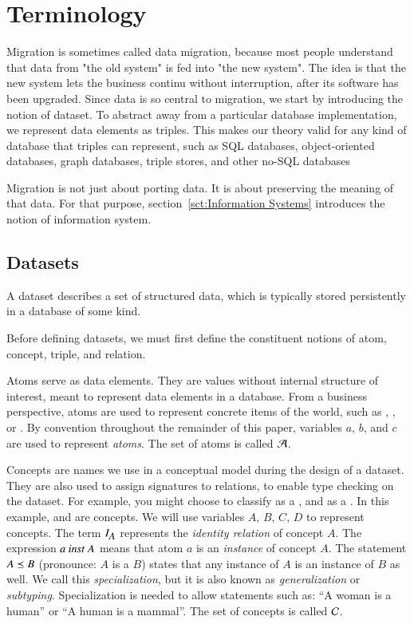 \documentclass{elsarticle}
\begin{document}
\section{Terminology}
\label{sct:Terminology}
	Migration is sometimes called data migration, because most people understand that data from "the old system" is fed into "the new system".
	The idea is that the new system lets the business continu without interruption, after its software has been upgraded.
	Since data is so central to migration, we start by introducing the notion of dataset.
	To abstract away from a particular database implementation,
	we represent data elements as triples.
	This makes our theory valid for any kind of database that triples can represent,
	such as SQL databases, object-oriented databases, graph databases, triple stores, and other no-SQL databases

	Migration is not just about porting data.
	It is about preserving the meaning of that data.
	For that purpose, section~\ref{sct:Information Systems} introduces the notion of information system.

\subsection{Datasets}
	A dataset describes a set of structured data, which is typically stored persistently in a database of some kind.

	Before defining datasets, we must first define the constituent notions of atom, concept, triple, and relation.
	
	Atoms serve as data elements.
	They are values without internal structure of interest, meant to represent data elements in a database.
	From a business perspective, atoms are used to represent concrete items of the world,
	such as , , or .
	By convention throughout the remainder of this paper, variables $a$, $b$, and $c$ are used to represent \emph{atoms}.
	The set of atoms is called $\mathcal{A}$.
	

	Concepts are names we use in a conceptual model during the design of a dataset.
	They are also used to assign signatures to relations, to enable type checking on the dataset.
	For example, you might choose to classify  as a , and  as a .
	In this example,  and  are concepts.
    We will use variables $A$, $B$, $C$, $D$ to represent concepts.
	The term $I_{\text{\it \small A\/}}$ represents the \emph{identity relation} of concept $A$.
	The expression $a\ \text{\it inst\/}\ A$ means that atom $a$ is an \emph{instance} of concept $A$.
	The statement $A\preceq B$ (pronounce: $A$ is a $B$) states that any instance of $A$ is an instance of $B$ as well.
	We call this {\em specialization}, but it is also known as {\em generalization} or {\em subtyping}.
	Specialization is needed to allow statements such as: ``A woman is a human'' or ``A human is a mammal''.
	The set of concepts is called $\mathcal{C}$.
	
\end{document}
